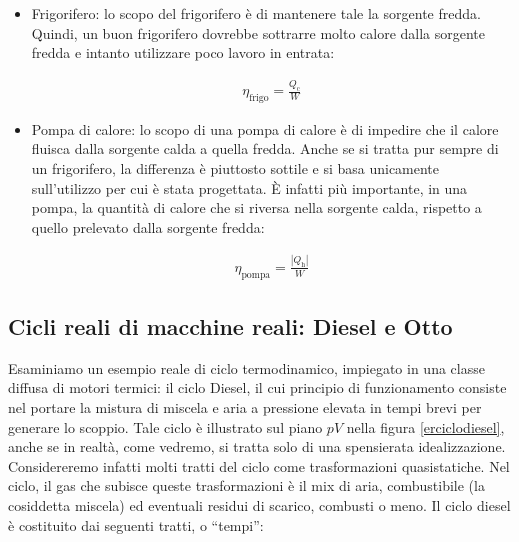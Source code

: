 \begin{itemize}
    \item Frigorifero: lo scopo del frigorifero è di mantenere tale la
    sorgente fredda. Quindi, un buon frigorifero dovrebbe sottrarre molto
    calore dalla sorgente fredda e intanto utilizzare poco lavoro in entrata:

    \begin{align}
        \eta_\text{frigo} = \frac{Q_\text{c}}{W}
    \end{align}

    \item Pompa di calore: lo scopo di una pompa di calore è di impedire che
    il calore fluisca dalla sorgente calda a quella fredda. Anche se si tratta
    pur sempre di un frigorifero, la differenza è piuttosto sottile e si basa
    unicamente sull'utilizzo per cui è stata progettata. È infatti più importante,
    in una pompa, la quantità di calore che si riversa nella sorgente calda,
    rispetto a quello prelevato dalla sorgente fredda:

    \begin{align}
        \eta_\text{pompa} = \frac{|Q_\text{h}|}{W}
    \end{align}
\end{itemize}

\subsection[Cicli Diesel e Otto]{Cicli reali di macchine reali: Diesel e Otto}
Esaminiamo un esempio reale di ciclo termodinamico, impiegato in
una classe diffusa di motori termici: il ciclo Diesel, il cui
principio di funzionamento consiste nel portare la mistura di
miscela e aria a pressione elevata in tempi brevi per generare
lo scoppio. Tale ciclo
è illustrato sul piano $pV$ nella figura \ref{erciclodiesel}, anche
se in realtà, come vedremo, si tratta solo di una spensierata idealizzazione.
Considereremo infatti molti tratti del ciclo come trasformazioni
quasistatiche. Nel ciclo, il gas che subisce queste trasformazioni
è il mix di aria, combustibile (la cosiddetta miscela) ed
eventuali residui di scarico, combusti o meno.
Il ciclo diesel è costituito dai seguenti tratti, o
``tempi'':

